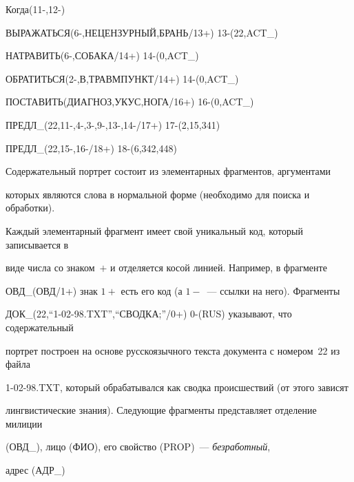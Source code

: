{    Когда(11-,12-)


   


    ВЫРАЖАТЬСЯ(6-,НЕЦЕНЗУРНЫЙ,БРАНЬ/13+)  13-(22,ACT\_)


   


    НАТРАВИТЬ(6-,СОБАКА/14+)  14-(0,ACT\_)


   


    ОБРАТИТЬСЯ(2-,В,ТРАВМПУНКТ/14+)  14-(0,ACT\_)  


      


    ПОСТАВИТЬ(ДИАГНОЗ,УКУС,НОГА/16+)  16-(0,ACT\_)  





   \medskip


   


     ПРЕДЛ\_(22,11-,4-,3-,9-,13-,14-/17+) 17-(2,15,341)


   


     ПРЕДЛ\_(22,15-,16-/18+)  18-(6,342,448)  }





   Содержательный портрет состоит из элементарных фрагментов, аргументами 


которых являются слова в нормальной форме (необходимо для поиска и обработки). 


Каждый элементарный фрагмент имеет свой уникальный код, который записывается в 


виде числа со знаком~$+$ и отделяется косой линией. Например, в фрагменте 


{\sf ОВД\_(ОВД/1+)} знак $1+$ есть его код (а $1-$~--- ссылки на него). Фрагменты 


{\sf ДОК\_(22,``1-02-98.TXT'',``СВОДКА;''/0+)  0-(RUS)} указывают, что содержательный 


портрет построен на основе русскоязычного текста документа с номером~22 из файла 


1-02-98.TXT, который обрабатывался как сводка происшествий (от этого зависят 


лингвистические знания).  Следующие фрагменты представляет отделение милиции 


({\sf ОВД\_}), лицо ({\sf ФИО}), его свойство ({\sf PROP})~--- \textit{безработный}, 


адрес ({\sf АДР\_}) 


